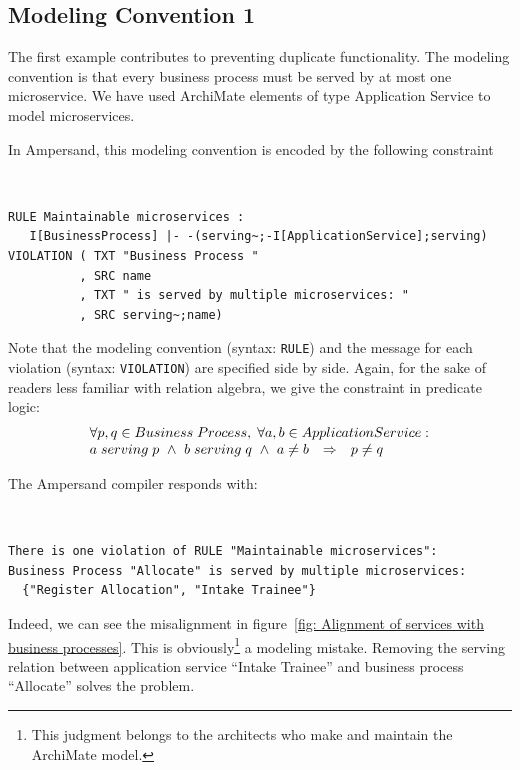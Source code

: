 \documentclass[sn-vancouver]{sn-jnl}%
\begin{document}
\subsection{Modeling Convention 1}
The first example contributes to preventing duplicate functionality.
The modeling convention is that every business process must be served by at most one microservice.
We have used ArchiMate elements of type Application Service to model microservices.

In Ampersand, this modeling convention is encoded by the following constraint
{\tt\small
\begin{lstlisting}[frame=single, label={mc1}, caption={}]
RULE Maintainable microservices :
   I[BusinessProcess] |- -(serving~;-I[ApplicationService];serving)
VIOLATION ( TXT "Business Process "
          , SRC name
          , TXT " is served by multiple microservices: "
          , SRC serving~;name)
\end{lstlisting}
}
Note that the modeling convention (syntax: {\small\verb#RULE#}) and the message for each violation (syntax: {\small\verb#VIOLATION#}) are specified side by side.
Again, for the sake of readers less familiar with relation algebra, we give the constraint in predicate logic:
\[\begin{array}{rcl}
   \multicolumn{3}{l}{\forall p,q \in Business\;Process, \;\forall a,b\in Application Service:}\\
   a \;serving \;p\ \wedge\ b \;serving \;q\ \wedge\ a\not =b&\Rightarrow&p\not =q
\end{array}\]

The Ampersand compiler responds with:

{\tt\small
\begin{lstlisting}[frame=single, label={mc1result}, caption={}]
There is one violation of RULE "Maintainable microservices":
Business Process "Allocate" is served by multiple microservices:
  {"Register Allocation", "Intake Trainee"}
\end{lstlisting}
}

Indeed, we can see the misalignment in figure~\ref{fig: Alignment of services with business processes}.
This is obviously\footnote{This judgment belongs to the architects who make and maintain the ArchiMate model.} a modeling mistake.
Removing the serving relation between application service ``Intake Trainee'' and business process ``Allocate'' solves the problem.
\end{document}
